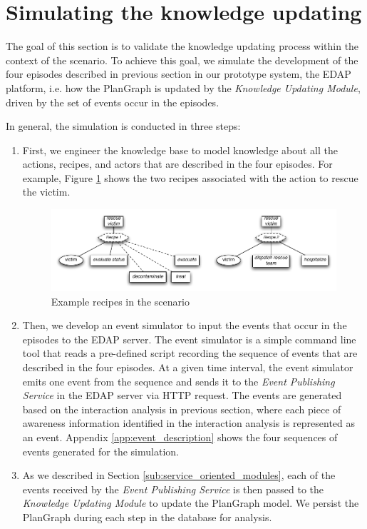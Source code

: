 \section{Simulating the knowledge updating} %
\label{sec:simulating_the_knowledge_updating}
The goal of this section is to validate the knowledge updating process within the context of the scenario. To achieve this goal, we simulate the development of the four episodes described in previous section in our prototype system, the EDAP platform, i.e. how the PlanGraph is updated by the \emph{Knowledge Updating Module}, driven by the set of events occur in the episodes. 

In general, the simulation is conducted in three steps:

\begin{enumerate}
	\item First, we engineer the knowledge base to model knowledge about all the actions, recipes, and actors that are described in the four episodes. For example, Figure \ref{fig:example_recipes_in_scenario} shows the two recipes associated with the action to rescue the victim.
	\begin{figure}[htbp] %
   		\centering
   		\includegraphics[width=5.8in]{example_recipes_in_scenario.pdf} 
   		\caption{Example recipes in the scenario}
   		\label{fig:example_recipes_in_scenario}
	\end{figure}
	\item Then, we develop an event simulator to input the events that occur in the episodes to the EDAP server. The event simulator is a simple command line tool that reads a pre-defined script recording the sequence of events that are described in the four episodes. At a given time interval, the event simulator emits one event from the sequence and sends it to the \emph{Event Publishing Service} in the EDAP server via HTTP request. The events are generated based on the interaction analysis in previous section, where each piece of awareness information identified in the interaction analysis is represented as an event. Appendix \ref{app:event_description} shows the four sequences of events generated for the simulation.
	\item As we described in Section \ref{sub:service_oriented_modules}, each of the events received by the \emph{Event Publishing Service} is then passed to the \emph{Knowledge Updating Module} to update the PlanGraph model. We persist the PlanGraph during each step in the database for analysis.
\end{enumerate}


